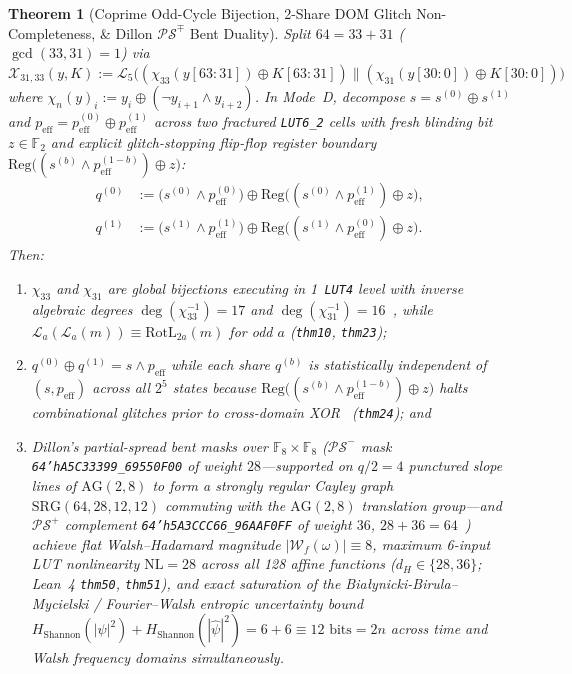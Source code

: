 \documentclass[11pt,letterpaper]{article}
\theoremstyle{spectralthm}
\newtheorem{theorem}{Theorem}[section]
\begin{document}
\begin{theorem}[Coprime Odd-Cycle Bijection, 2-Share DOM Glitch Non-Completeness, \& Dillon $\mathcal{PS}^\mp$ Bent Duality]
\label{thm:coprime_chi}
\label{thm:dom_dillon}
Split $64 = 33 + 31$ ($\gcd(33,31) = 1$) via $\mathcal{X}_{31,33}(y, K) := \mathcal{L}_5\bigl((\chi_{33}(y[63:31]) \oplus K[63:31]) \parallel (\chi_{31}(y[30:0]) \oplus K[30:0])\bigr)$ where $\chi_n(y)_i := y_i \oplus (\neg y_{i+1} \wedge y_{i+2})$. In Mode~D, decompose $s = s^{(0)} \oplus s^{(1)}$ and $p_{\mathrm{eff}} = p_{\mathrm{eff}}^{(0)} \oplus p_{\mathrm{eff}}^{(1)}$ across two fractured \mbox{\texttt{LUT6\_2}} cells with fresh blinding bit $z \in \mathbb{F}_2$ and explicit glitch-stopping flip-flop register boundary $\mathrm{Reg}\bigl((s^{(b)} \wedge p_{\mathrm{eff}}^{(1-b)}) \oplus z\bigr)$:
\begin{equation}
\label{eq:dom_lut6}
\begin{aligned}
q^{(0)} &:= \bigl(s^{(0)} \wedge p_{\mathrm{eff}}^{(0)}\bigr) \oplus \mathrm{Reg}\bigl((s^{(0)} \wedge p_{\mathrm{eff}}^{(1)}) \oplus z\bigr),\\
q^{(1)} &:= \bigl(s^{(1)} \wedge p_{\mathrm{eff}}^{(1)}\bigr) \oplus \mathrm{Reg}\bigl((s^{(1)} \wedge p_{\mathrm{eff}}^{(0)}) \oplus z\bigr).
\end{aligned}
\end{equation}
Then:
\begin{enumerate}
  \item[(i)] $\chi_{33}$ and $\chi_{31}$ are global bijections executing in 1~\texttt{LUT4} level with inverse algebraic degrees $\deg(\chi_{33}^{-1}) = 17$ and $\deg(\chi_{31}^{-1}) = 16$~\cite{daemen1995cipher}, while $\mathcal{L}_a(\mathcal{L}_a(m)) \equiv \mathrm{RotL}_{2a}(m)$ for odd $a$ (\texttt{thm10}, \texttt{thm23});
  \item[(ii)] $q^{(0)} \oplus q^{(1)} = s \wedge p_{\mathrm{eff}}$ while each share $q^{(b)}$ is statistically independent of $(s, p_{\mathrm{eff}})$ across all $2^5$ states because $\mathrm{Reg}\bigl((s^{(b)} \wedge p_{\mathrm{eff}}^{(1-b)}) \oplus z\bigr)$ halts combinational glitches prior to cross-domain XOR~\cite{gross2016dom} (\texttt{thm24}); and
  \item[(iii)] Dillon's partial-spread bent masks over $\mathbb{F}_8 \times \mathbb{F}_8$ ($\mathcal{PS}^-$ mask \texttt{64'hA5C33399\_69550F00} of weight $28$---supported on $q/2 = 4$ punctured slope lines of $\mathrm{AG}(2,8)$ to form a strongly regular Cayley graph $\mathrm{SRG}(64,28,12,12)$ commuting with the $\mathrm{AG}(2,8)$ translation group---and $\mathcal{PS}^+$ complement \texttt{64'h5A3CCC66\_96AAF0FF} of weight $36$, $28+36=64$~\cite{dillon1974elementary, rothaus1976bent}) achieve flat Walsh--Hadamard magnitude $|\mathcal{W}_f(\omega)| \equiv 8$, maximum 6-input LUT nonlinearity $\mathrm{NL} = 28$ across all 128 affine functions ($d_H \in \{28, 36\}$; Lean~4 \texttt{thm50}, \texttt{thm51}), and exact saturation of the Bia\l{}ynicki-Birula--Mycielski / Fourier--Walsh entropic uncertainty bound~\cite{mckean1967curvature} $H_{\mathrm{Shannon}}(|\psi|^2) + H_{\mathrm{Shannon}}(|\widehat{\psi}|^2) = 6 + 6 \equiv 12\text{~bits} = 2n$ across time and Walsh frequency domains simultaneously.
\end{enumerate}
\end{theorem}
\end{document}
